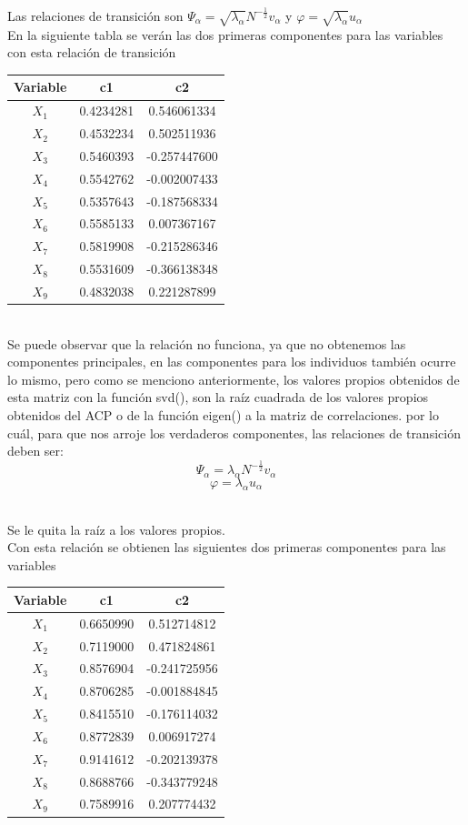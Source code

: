 \documentclass[report,oneside]{revcoles}
\begin{document}
~\\Las relaciones de transición son $\Psi_\alpha=\sqrt{\lambda_\alpha} N^{-\frac{1}{2}} v_\alpha$  \;\; y \;\;   $\varphi=\sqrt{\lambda_\alpha}u_\alpha$ 
~\\En la siguiente tabla se verán las dos primeras componentes para las variables con esta relación de transición 
\begin{center}
\begin{tabular}{|c|c|c|}
\hline 
Variable & c1 & c2 \\ 
\hline 
$X_1$ & 0.4234281  & 0.546061334 \\             
$X_2$ & 0.4532234 &  0.502511936\\  
$X_3$ & 0.5460393 & -0.257447600 \\  
$X_4$ & 0.5542762 &  -0.002007433\\  
$X_5$ & 0.5357643 &   -0.187568334\\  
$X_6$ & 0.5585133 &   0.007367167\\   
$X_7$ & 0.5819908 & -0.215286346 \\  
$X_8$ & 0.5531609 & -0.366138348   \\  
$X_9$ & 0.4832038 & 0.221287899 \\ 
\hline 
\end{tabular} 
\end{center}

~\\Se puede observar que la relación no funciona, ya que no obtenemos las componentes principales, en las componentes para los individuos también ocurre lo mismo, pero como se menciono anteriormente, los valores propios obtenidos de esta matriz con la función svd(), son la raíz cuadrada de los valores propios obtenidos del ACP o de la función eigen() a la matriz de correlaciones. por lo cuál, para que nos arroje los verdaderos componentes, las relaciones de transición deben ser:
$$\Psi_\alpha=\lambda_\alpha N^{-\frac{1}{2}} v_\alpha$$
$$\varphi=\lambda_\alpha u_\alpha$$

~\\Se le quita la raíz a los valores propios.
~\\Con esta relación se obtienen las siguientes dos primeras componentes para las variables
\begin{center}
\begin{tabular}{|c|c|c|}
\hline 
Variable & c1 & c2 \\ 
\hline 
$X_1$ & 0.6650990  & 0.512714812 \\ 
$X_2$ & 0.7119000 &  0.471824861\\  
$X_3$ & 0.8576904 & -0.241725956 \\  
$X_4$ & 0.8706285 &  -0.001884845\\  
$X_5$ & 0.8415510 &  -0.176114032\\  
$X_6$ & 0.8772839 &  0.006917274\\ 
$X_7$ & 0.9141612 & -0.202139378 \\  
$X_8$ & 0.8688766 & -0.343779248  \\  
$X_9$ & 0.7589916 & 0.207774432 \\ 
\hline 
\end{tabular} 
\end{center}
\end{document}
